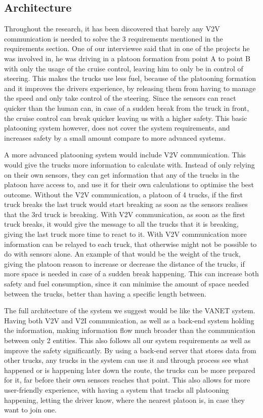 % 
% 
\subsection{Architecture}
%
Throughout the research, it has been discovered that barely any V2V communication is needed to solve the 3 requirements mentioned in the requirements section. One of our interviewee said that in one of the projects he was involved in, he was driving in a platoon formation from point A to point B with only the usage of the cruise control, leaving him to only be in control of steering. This makes the trucks use less fuel, because of the platooning formation and it improves the drivers experience, by releasing them from having to manage the speed and only take control of the steering. Since the sensors can react quicker than the human can, in case of a sudden break from the truck in front, the cruise control can break quicker leaving us with a higher safety. This basic platooning system however, does not cover the system requirements, and increases safety by a small amount compare to more advanced systems.\par
%
A more advanced platooning system would include V2V communication. This would give the trucks more information to calculate with. Instead of only relying on their own sensors, they can get information that any of the trucks in the platoon have access to, and use it for their own calculations to optimise the best outcome. Without the V2V communication, a platoon of 4 trucks, if the first truck breaks the last truck would start breaking as soon as the sensors realises that the 3rd truck is breaking. With V2V communication, as soon as the first truck breaks, it would give the message to all the trucks that it is breaking, giving the last truck more time to react to it. With V2V communication more information can be relayed to each truck, that otherwise might not be possible to do with sensors alone. An example of that would be the weight of the truck, giving the platoon reason to increase or decrease the distance of the trucks, if more space is needed in case of a sudden break happening. This can increase both safety and fuel consumption, since it can minimise the amount of space needed between the trucks, better than having a specific length between.\par
%
The full architecture of the system we suggest would be like the VANET system. Having both V2V and V2I communication, as well as a back-end system holding the information, making information flow much broader than the communication between only 2 entities. This also follows all our system requirements as well as improve the safety significantly. By using a back-end server that stores data from other trucks, any trucks in the system can use it and through process see what happened or is happening later down the route, the trucks can be more prepared for it, far before their own sensors reaches that point. This also allows for more user-friendly experience, with having a system that tracks all platooning happening, letting the driver know, where the nearest platoon is, in case they want to join one.
% 
